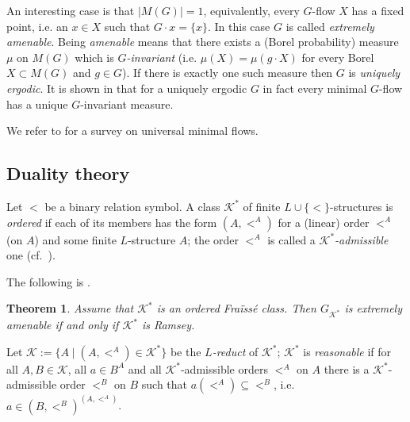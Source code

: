 \documentclass[12pt]{amsart}
\theoremstyle{plain}
\newtheorem{theorem}{Theorem}[section]
\theoremstyle{definition}
\begin{document}
An interesting case is that $|M(G)|=1$, equivalently, every $G$-flow $X$ has a fixed point, i.e. 
an $x\in X$ such that $G\cdot x=\{x\}$. In this case $G$ is called {\em extremely amenable}. 
Being {\em amenable} means that there exists a (Borel probability) measure $\mu$ on $M(G)$ which 
is {\em $G$-invariant} (i.e. $\mu(X)=\mu(g\cdot X)$ for every Borel $X\subset M(G)$ and $g\in G$). 
If there is exactly one such measure then
$G$ is {\em uniquely ergodic}. It is shown in \cite[P8.1]{akl} that for a uniquely ergodic  $G$ 
in fact every minimal $G$-flow has a unique $G$-invariant measure. 

We refer to \cite[$\S 1$]{kpt} for a survey on universal minimal flows.

\subsection{Duality theory} Let $<$ be a binary relation symbol.  
A class ${\mathcal K}^*$ of finite $L\cup\{<\}$-structures is {\em ordered} if each of its members 
has the form $(A,<^A)$ for a (linear) order $<^A$ (on $A$) and some finite $L$-structure $A$; the 
order $<^A$ is called a {\em ${\mathcal K}^*$-admissible} one (cf.~\cite{nesetril}). 

The following is \cite[T4.8]{kpt}.

\begin{theorem}\label{thm:extremeamenability} Assume that ${\mathcal K}^*$ is an ordered Fra\"iss\'e class.
Then $G_{{\mathcal K}^*}$ is extremely amenable if and  only if ${\mathcal K}^*$ is Ramsey.
\end{theorem}

Let ${\mathcal K}:=\{A\mid (A,<^A)\in {\mathcal K}^*\}$ be the {\em $L$-reduct} of ${\mathcal K}^*$; ${\mathcal K}^*$ is {\em reasonable} if 
for all $A,B\in{\mathcal K}$, all $a\in B^A$ and all ${\mathcal K}^*$-admissible orders $<^A$ on $A$ 
there is a ${\mathcal K}^*$-admissible order $<^B$ on $B$ such that $a(<^A)\subseteq <^B$, i.e. $a\in (B,<^B)^{(A,<^A)}$. 
\end{document}
